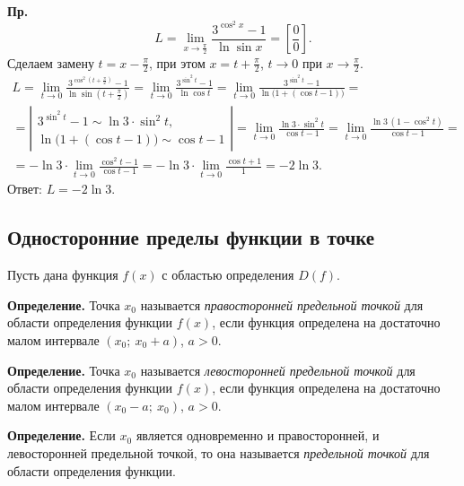 \documentclass[a4paper,11pt]{article}
\begin{document}
\textbf{Пр.}
\[
  L = \lim_{x \to \frac{\pi}{2}} \frac{3^{\cos^2 x} - 1}{\ln \sin x} = \left[\frac{0}{0}\right].
\]
Сделаем замену $t = x - \frac{\pi}{2}$, при этом $x = t + \frac{\pi}{2}$, $t \to 0$ при
$x \to \frac{\pi}{2}$.
\begin{multline*}
  L = \lim_{t \to 0} \frac{3^{\cos^2 \left(t + \frac{\pi}{2}\right)} - 1}{\ln \sin\left(t + \frac{\pi}{2}\right)}
  = \lim_{t \to 0} \frac{3^{\sin^2 t} - 1}{\ln \cos t}
  = \lim_{t \to 0} \frac{3^{\sin^2 t} - 1}{\ln\big(1 + (\cos t - 1)\big)} = \\
  = \left|\begin{array}{l}
      3^{\sin^2 t} - 1 \sim \ln 3 \cdot \sin^2 t,\\
      \ln\big(1 + (\cos t - 1)\big) \sim \cos t - 1
    \end{array}\right|
  = \lim_{t \to 0} \frac{\ln 3 \cdot \sin^2 t}{\cos t - 1}
  = \lim_{t \to 0} \frac{\ln 3 \,(1 - \cos^2 t)}{\cos t - 1} = \\
  = -\ln 3 \cdot \lim_{t \to 0} \frac{\cos^2 t - 1}{\cos t - 1}
  = -\ln 3 \cdot \lim_{t \to 0} \frac{\cos t + 1}{1}
  = -2 \ln 3.
\end{multline*}
Ответ: $L = -2\ln 3$.

\subsection{Односторонние пределы функции в точке}

Пусть дана функция $f(x)$ с областью определения $D(f)$.

\begin{opr}
\textbf{Определение.} Точка $x_0$ называется \emph{правосторонней предельной точкой} для области определения
функции $f(x)$, если функция определена на достаточно малом интервале $(x_0;\ x_0 + a)$, $a > 0$.
\end{opr}

\begin{opr}
\textbf{Определение.} Точка $x_0$ называется \emph{левосторонней предельной точкой} для области определения
функции $f(x)$, если функция определена на достаточно малом интервале $(x_0 - a;\ x_0)$, $a > 0$.
\end{opr}

\begin{opr}
\textbf{Определение.} Если $x_0$ является одновременно и правосторонней, и левосторонней предельной точкой,
то она называется \emph{предельной точкой} для области определения функции.
\end{opr}
\end{document}
